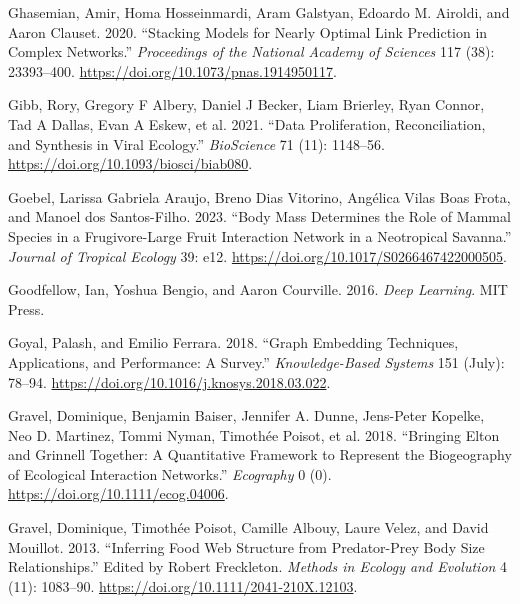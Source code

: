 \documentclass[
  letterpaper,
  DIV=11,
  numbers=noendperiod]{scrartcl}
\newlength{\cslhangindent}
\newlength{\cslentryspacingunit} %
\newenvironment{CSLReferences}[2] %
 {%
  \setlength{\parindent}{0pt}
  \ifodd #1
  \let\oldpar\par
  \def\par{\hangindent=\cslhangindent\oldpar}
  \fi
  \setlength{\parskip}{#2\cslentryspacingunit}
 }%
 {}
\begin{document}
\begin{CSLReferences}{1}{0}
\leavevmode{}%
Ghasemian, Amir, Homa Hosseinmardi, Aram Galstyan, Edoardo M. Airoldi,
and Aaron Clauset. 2020. {``Stacking Models for Nearly Optimal Link
Prediction in Complex Networks.''} \emph{Proceedings of the National
Academy of Sciences} 117 (38): 23393--400.
\url{https://doi.org/10.1073/pnas.1914950117}.

\leavevmode{}%
Gibb, Rory, Gregory F Albery, Daniel J Becker, Liam Brierley, Ryan
Connor, Tad A Dallas, Evan A Eskew, et al. 2021. {``Data
{Proliferation}, {Reconciliation}, and {Synthesis} in {Viral
Ecology}.''} \emph{BioScience} 71 (11): 1148--56.
\url{https://doi.org/10.1093/biosci/biab080}.

\leavevmode{}%
Goebel, Larissa Gabriela Araujo, Breno Dias Vitorino, Angélica Vilas
Boas Frota, and Manoel dos Santos-Filho. 2023. {``Body Mass Determines
the Role of Mammal Species in a Frugivore-Large Fruit Interaction
Network in a {Neotropical} Savanna.''} \emph{Journal of Tropical
Ecology} 39: e12. \url{https://doi.org/10.1017/S0266467422000505}.

\leavevmode{}%
Goodfellow, Ian, Yoshua Bengio, and Aaron Courville. 2016. \emph{Deep
Learning}. {MIT Press}.

\leavevmode{}%
Goyal, Palash, and Emilio Ferrara. 2018. {``Graph Embedding Techniques,
Applications, and Performance: {A} Survey.''} \emph{Knowledge-Based
Systems} 151 (July): 78--94.
\url{https://doi.org/10.1016/j.knosys.2018.03.022}.

\leavevmode{}%
Gravel, Dominique, Benjamin Baiser, Jennifer A. Dunne, Jens-Peter
Kopelke, Neo D. Martinez, Tommi Nyman, Timothée Poisot, et al. 2018.
{``Bringing {Elton} and {Grinnell} Together: A Quantitative Framework to
Represent the Biogeography of Ecological Interaction Networks.''}
\emph{Ecography} 0 (0). \url{https://doi.org/10.1111/ecog.04006}.

\leavevmode{}%
Gravel, Dominique, Timothée Poisot, Camille Albouy, Laure Velez, and
David Mouillot. 2013. {``Inferring Food Web Structure from Predator-Prey
Body Size Relationships.''} Edited by Robert Freckleton. \emph{Methods
in Ecology and Evolution} 4 (11): 1083--90.
\url{https://doi.org/10.1111/2041-210X.12103}.


\end{CSLReferences}
\end{document}
